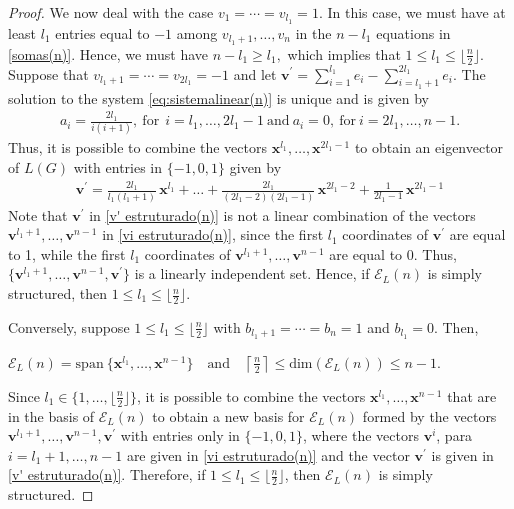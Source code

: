 \documentclass[preprint]{elsarticle}
\begin{document}
\begin{proof}
We now deal with the case $v_{1} = \cdots = v_{l_1} =1.$ In this case, we must have at least $l_1$ entries equal to $-1$ among $v_{l_1+1},\ldots,v_{n}$ in the $n-l_1$  equations in \eqref{somas(n)}. Hence, we must have  $n-l_1 \geq l_1,$ which implies that $1\leq l_1 \leq \lfloor \frac{n}{2} \rfloor.$ Suppose that $v_{l_1+1} = \cdots = v_{2l_1} =-1$ and let  $\mathbf{v}^{\prime}=\sum_{i=1}^{l_1} e_i-\sum_{i=l_1+1}^{2l_1} e_{i}$. The solution to the system \eqref{eq:sistemalinear(n)} is unique and is given by
\begin{align*}
    a_i=\frac{2l_1}{i(i+1)}, \ \text{for} \ \  i=l_1, \ldots, 2l_1-1 \ \text{and} \ a_i=0, \ \text{for} \ i=2l_1, \ldots, n-1.
\end{align*}
Thus, it is possible to combine the vectors  $\mathbf{x}^{l_1},\ldots,\mathbf{x}^{2l_1-1}$ to obtain an eigenvector of $L(G)$ with entries in $\{-1,0,1\}$ given by
\begin{align}\label{v' estruturado(n)}
    \mathbf{v}^{\prime}=\frac{2l_1}{l_1(l_1+1)} \, \mathbf{x}^{l_1} + \ldots + \frac{2l_1}{(2l_1-2)(2l_1-1)} \, \mathbf{x}^{2l_1-2} + \frac{1}{2l_1-1} \, \mathbf{x}^{2l_1-1}
\end{align}
Note that $\mathbf{v}^{\prime}$ in \eqref{v' estruturado(n)} is not a linear combination of the vectors $\mathbf{v}^{l_1+1}, \ldots, \mathbf{v}^{n-1}$ in \eqref{vi estruturado(n)}, since the first $l_1$ coordinates of $\mathbf{v}^{\prime}$ are equal to 1, while the first $l_1$ coordinates of  $\mathbf{v}^{l_1+1}, \ldots, \mathbf{v}^{n-1}$ are equal to 0. Thus, $\{\mathbf{v}^{l_1+1},\ldots,\mathbf{v}^{n-1}, \mathbf{v}^{\prime}\}$ is a linearly independent set. Hence, if $\mathcal{E}_L(n)$ is simply structured, then $1\leq l_1 \leq \lfloor \frac{n}{2} \rfloor.$

Conversely, suppose $1\leq l_1 \leq \lfloor \frac{n}{2} \rfloor$ with $b_{l_1+1}=\cdots=b_n=1$ and $b_{l_1}=0$. Then, 
\begin{center}
$\mathcal{E}_L(n)=\mathrm{span} \ \{ \mathbf{x}^{l_1}, \ldots, \mathbf{x}^{n-1} \} \quad  \textrm{and} \quad \left\lceil \frac{n}{2} \right\rceil \leq \mathrm{dim}(\mathcal{E}_{L}(n)) \leq n-1.$
\end{center} 
Since $l_1 \in \{1,\ldots, \lfloor \frac{n}{2} \rfloor\}$, it is possible to combine the vectors  $\mathbf{x}^{l_1}, \ldots, \mathbf{x}^{n-1}$ that are in the basis of $\mathcal{E}_L(n)$  to obtain a new basis for $\mathcal{E}_L(n)$ formed by the vectors $\mathbf{v}^{l_1+1}, \ldots, \mathbf{v}^{n-1},\mathbf{v}^{\prime}$ with entries only in $\{-1,0,1\}$, where the vectors $\mathbf{v}^{i}$, para $i=l_1+1, \ldots, n-1$ are given in \eqref{vi estruturado(n)} and the vector  $\mathbf{v}^{\prime}$ is given in \eqref{v' estruturado(n)}. Therefore, if $1\leq l_1 \leq \lfloor \frac{n}{2} \rfloor$, then  $\mathcal{E}_L(n)$ is simply structured.
\end{proof} 
\end{document}
